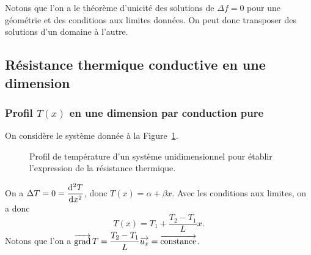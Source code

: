         Notons que l'on a le théorème d'unicité des solutions de $\Delta f=0$ pour une géométrie et des conditions aux limites données. On peut donc transposer des solutions d'un domaine à l'autre.

    \subsection{Résistance thermique conductive en une dimension}
        \subsubsection{Profil $T(x)$ en une dimension par conduction pure}

            On considère le système donnée à la Figure~\ref{fig:resistance_thermique_conductive_1d}.
            \begin{figure}
                \centering
                \caption{Profil de température d'un système unidimensionnel pour établir l'expression de la résistance thermique.}    
                \label{fig:resistance_thermique_conductive_1d}
            \end{figure}

            On a $\Delta T=0=\dfrac{\mathrm{d}^{2}T}{\mathrm{d} x^{2}}$, donc $T(x)=\alpha+\beta x$. Avec les conditions aux limites, on a donc
            \begin{equation*}
                T(x)=T_1+\frac{T_2-T_1}{L}x.
            \end{equation*}
            Notons que l'on a $\operatorname{\overrightarrow{\text{grad}}} T=\dfrac{T_2-T_1}{L}\protect\overrightarrow{{u_x}}=\protect\overrightarrow{{\mathrm{constance}}}$.

